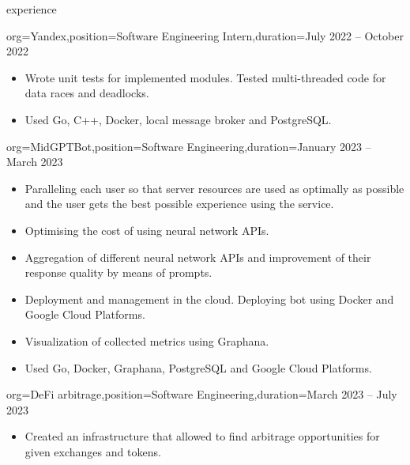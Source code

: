 \documentclass{resume}
\begin{document}
\begin{ResumeSection}{experience}
\begin{ResumeSubsection}{org=Yandex,position={Software Engineering Intern},duration=July 2022 – October 2022}
\begin{itemize}
            \item {
                Wrote unit tests for implemented modules. Tested multi-threaded code for data races and deadlocks.
            }

            \item {
                Used Go, C++, Docker, local message broker and PostgreSQL.
            }
        \end{itemize}
    \end{ResumeSubsection}

    \begin{ResumeSubsection}{org=MidGPTBot,position={Software Engineering},duration=January 2023 – March 2023}
        \begin{itemize}
            \item {
                Paralleling each user so that server resources are used as optimally as possible and the user gets the best possible experience using the service.
            }

            \item {
                Optimising the cost of using neural network APIs.
            }

            \item {
                Aggregation of different neural network APIs and improvement of their response \- quality by means of prompts.
            }

            \item {
                Deployment and management in the cloud. Deploying bot using Docker and Google Cloud Platforms.
            }

            \item {
                Visualization of collected metrics using Graphana.
            }

            \item {
                Used Go, Docker, Graphana, PostgreSQL and Google Cloud Platforms.
            }
        \end{itemize}
    \end{ResumeSubsection}
    \begin{ResumeSubsection}{org=DeFi arbitrage,position={Software Engineering},duration=March 2023 – July 2023}
        \begin{itemize}
            \item {
                Created an infrastructure that allowed to find arbitrage opportunities for given exchanges and tokens.
            }


\end{itemize}
\end{ResumeSubsection}
\end{ResumeSection}
\end{document}
